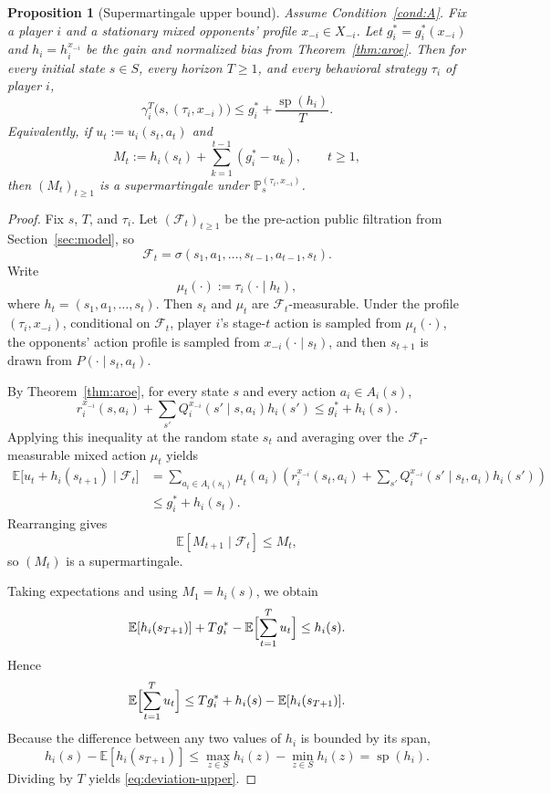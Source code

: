 \documentclass[11pt]{article}
\newtheorem{proposition}[theorem]{Proposition}
\theoremstyle{definition}
\newcommand{\E}{\mathbb{E}}
\newcommand{\Prob}{\mathbb{P}}
\newcommand{\1}{\mathbf{1}}
\DeclareMathOperator{\spn}{sp}
\begin{document}
\begin{proposition}[Supermartingale upper bound]\label{prop:supermartingale}
Assume Condition~\ref{cond:A}. Fix a player $i$ and a stationary mixed opponents' profile $x_{-i}\in X_{-i}$. Let $g_i^*=g_i^*(x_{-i})$ and $h_i=h_i^{x_{-i}}$ be the gain and normalized bias from Theorem~\ref{thm:aroe}. Then for every initial state $s\in S$, every horizon $T\ge1$, and every behavioral strategy $\tau_i$ of player $i$,
\begin{equation}\label{eq:deviation-upper}
\gamma_i^T\bigl(s,(\tau_i,x_{-i})\bigr)
\le g_i^*+\frac{\spn(h_i)}{T}.
\end{equation}
Equivalently, if $u_t:=u_i(s_t,a_t)$ and
\[
M_t:=h_i(s_t)+\sum_{k=1}^{t-1}(g_i^*-u_k),\qquad t\ge1,
\]
then $(M_t)_{t\ge1}$ is a supermartingale under $\Prob_s^{(\tau_i,x_{-i})}$.
\end{proposition}

\begin{proof}
Fix $s$, $T$, and $\tau_i$. Let $(\mathcal F_t)_{t\ge1}$ be the pre-action public filtration from Section~\ref{sec:model}, so
\[
\mathcal F_t=\sigma(s_1,a_1,\dots,s_{t-1},a_{t-1},s_t).
\]
Write
\[
\mu_t(\cdot):=\tau_i(\cdot\mid h_t),
\]
where $h_t=(s_1,a_1,\dots,s_t)$. Then $s_t$ and $\mu_t$ are $\mathcal F_t$-measurable. Under the profile $(\tau_i,x_{-i})$, conditional on $\mathcal F_t$, player $i$'s stage-$t$ action is sampled from $\mu_t(\cdot)$, the opponents' action profile is sampled from $x_{-i}(\cdot\mid s_t)$, and then $s_{t+1}$ is drawn from $P(\cdot\mid s_t,a_t)$.

By Theorem~\ref{thm:aroe}, for every state $s$ and every action $a_i\in A_i(s)$,
\[
r_i^{x_{-i}}(s,a_i)+\sum_{s'}Q_i^{x_{-i}}(s'\mid s,a_i)h_i(s')\le g_i^*+h_i(s).
\]
Applying this inequality at the random state $s_t$ and averaging over the $\mathcal F_t$-measurable mixed action $\mu_t$ yields
\begin{align*}
\E\bigl[u_t+h_i(s_{t+1})\mid\mathcal F_t\bigr]
&=\sum_{a_i\in A_i(s_t)}\mu_t(a_i)\left(r_i^{x_{-i}}(s_t,a_i)+\sum_{s'}Q_i^{x_{-i}}(s'\mid s_t,a_i)h_i(s')\right)\\
&\le g_i^*+h_i(s_t).
\end{align*}
Rearranging gives
\[
\E[M_{t+1}\mid \mathcal F_t]\le M_t,
\]
so $(M_t)$ is a supermartingale.

Taking expectations and using $M_1=h_i(s)$, we obtain
\[
\E[h_i(s_{T+1})]+Tg_i^*-\E\Bigl[\sum_{t=1}^{T}u_t\Bigr]\le h_i(s).
\]
Hence
\[
\E\Bigl[\sum_{t=1}^{T}u_t\Bigr]\le Tg_i^*+h_i(s)-\E[h_i(s_{T+1})].
\]
Because the difference between any two values of $h_i$ is bounded by its span,
\[
h_i(s)-\E[h_i(s_{T+1})]\le \max_{z\in S}h_i(z)-\min_{z\in S}h_i(z)=\spn(h_i).
\]
Dividing by $T$ yields \eqref{eq:deviation-upper}.
\end{proof}
\end{document}
